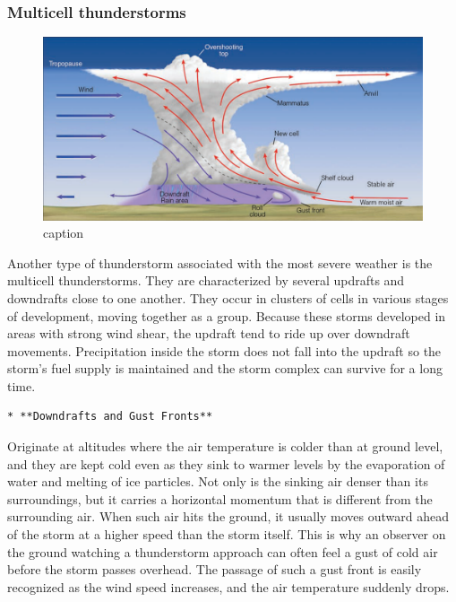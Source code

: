 \documentclass[12pt,oneside]{book}
\begin{document}
\subsubsection{Multicell thunderstorms}\label{multicell-thunderstorms}

\begin{figure}

{\centering \includegraphics[width=0.8\linewidth]{figures/FigureE3} 

}

\caption{caption}\label{fig:Multicellthunderstorms}
\end{figure}

Another type of thunderstorm associated with the most severe weather is
the multicell thunderstorms. They are characterized by several updrafts
and downdrafts close to one another. They occur in clusters of cells in
various stages of development, moving together as a group. Because these
storms developed in areas with strong wind shear, the updraft tend to
ride up over downdraft movements. Precipitation inside the storm does
not fall into the updraft so the storm's fuel supply is maintained and
the storm complex can survive for a long time.

\begin{verbatim}
* **Downdrafts and Gust Fronts**
\end{verbatim}

Originate at altitudes where the air temperature is colder than at
ground level, and they are kept cold even as they sink to warmer levels
by the evaporation of water and melting of ice particles. Not only is
the sinking air denser than its surroundings, but it carries a
horizontal momentum that is different from the surrounding air. When
such air hits the ground, it usually moves outward ahead of the storm at
a higher speed than the storm itself. This is why an observer on the
ground watching a thunderstorm approach can often feel a gust of cold
air before the storm passes overhead. The passage of such a gust front
is easily recognized as the wind speed increases, and the air
temperature suddenly drops.
\end{document}
